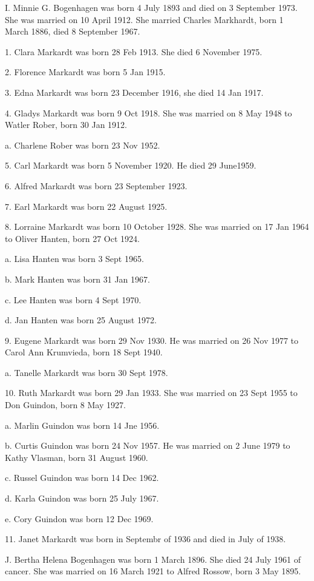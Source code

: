 \documentclass[a4paper]{article}
\begin{document}
I. Minnie G. Bogenhagen was born 4 July 1893 and died on 3 September 1973.  She was married on 10 April 1912.  She married Charles Markhardt, born 1 March 1886, died 8 September 1967.
 
1. Clara Markardt was born 28 Feb 1913.  She died 6 November 1975.

2. Florence Markardt was born 5 Jan 1915.  

3. Edna Markardt was born 23 December 1916, she died 14 Jan 1917.

4. Gladys Markardt was born 9 Oct 1918.  She was married on 8 May 1948 to Watler Rober, born 30 Jan 1912.  
 
a. Charlene Rober was born 23 Nov 1952.

5. Carl Markardt was born 5 November 1920.  He died 29 June1959.
 
6. Alfred Markardt was born 23 September 1923.

7. Earl Markardt was born 22 August 1925.

8. Lorraine Markardt was born 10 October 1928.  She was married on 17 Jan 1964 to Oliver Hanten, born 27 Oct 1924.
 
a. Lisa Hanten was born 3 Sept 1965. 

b. Mark Hanten was born 31 Jan 1967.

c. Lee Hanten was born 4 Sept 1970.

d. Jan Hanten was born 25 August 1972.

9. Eugene Markardt was born 29 Nov 1930.  He was married on 26 Nov 1977 to Carol Ann Krumvieda, born 18 Sept 1940.
 
a. Tanelle Markardt was born 30 Sept 1978.

10. Ruth Markardt was born 29 Jan 1933.  She was married on 23 Sept 1955 to Don Guindon, born 8 May 1927.
 
a. Marlin Guindon was born 14 Jne 1956.

b. Curtis Guindon was born 24 Nov 1957.  He was married on 2 June 1979 to Kathy Vlasman, born 31 August 1960.
 
c. Russel Guindon was born 14 Dec 1962.

d. Karla Guindon was born 25 July 1967.

e. Cory Guindon was born 12 Dec 1969.

11. Janet Markardt was born in Septembr of 1936 and died in July of 1938.

J. Bertha Helena Bogenhagen was born 1 March 1896.  She died 24 July 1961 of cancer. She was married on 16 March 1921 to Alfred Rossow, born 3 May 1895.
 
\end{document}
